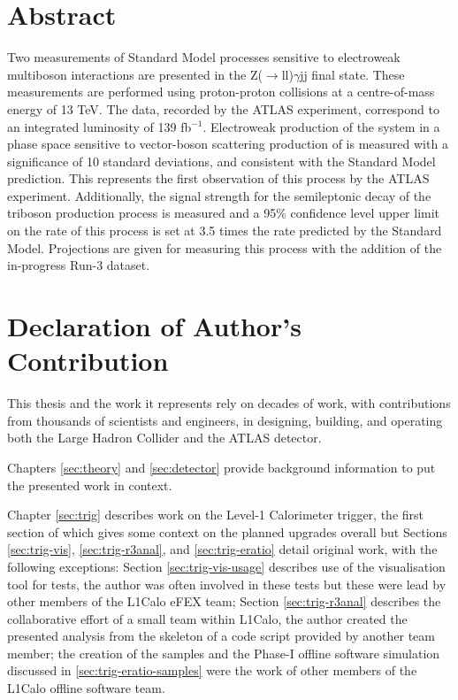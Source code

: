 \chapter*{Abstract}
Two measurements of Standard Model processes sensitive to electroweak multiboson
interactions are presented in the Z($\to$ll)$\gamma$jj final state. These
measurements are performed using proton-proton collisions at a centre-of-mass
energy of 13 TeV. The data, recorded by the \acs{ATLAS} experiment, correspond
to an integrated luminosity of 139 fb$^{-1}$.  Electroweak production of the
\Zyjj system in a phase space sensitive to vector-boson scattering production of
\Zy is measured with a significance of 10 standard deviations, and consistent
with the Standard Model prediction. This represents the first observation of
this process by the \acs{ATLAS} experiment.  Additionally, the signal strength
for the semileptonic decay of the \VZy triboson production process is measured
and a 95\% confidence level upper limit on the rate of this process is set at
3.5 times the rate predicted by the Standard Model. Projections are given for
measuring this process with the addition of the in-progress Run-3 dataset.
%
%
\clearpage
\chapter*{Declaration of Author's Contribution}

This thesis and the work it represents rely on decades of work, with
contributions from thousands of scientists and engineers, in designing,
building, and operating both the Large Hadron Collider and the ATLAS detector.

Chapters \ref{sec:theory} and \ref{sec:detector} provide background information
to put the presented work in context.

Chapter \ref{sec:trig} describes work on the Level-1 Calorimeter trigger, the
first section of which gives some context on the planned upgrades overall but
Sections \ref{sec:trig-vis}, \ref{sec:trig-r3anal}, and \ref{sec:trig-eratio}
detail original work, with the following exceptions: Section
\ref{sec:trig-vis-usage} describes use of the visualisation tool for tests, the
author was often involved in these tests but these were lead by other members of
the \acs{L1Calo} \acs{eFEX} team; Section \ref{sec:trig-r3anal} describes the
collaborative effort of a small team within \acs{L1Calo}, the author created the
presented analysis from the skeleton of a code script provided by another team
member; the creation of the samples and the Phase-I offline software simulation
discussed in \ref{sec:trig-eratio-samples} were the work of other members of the
\acs{L1Calo} offline software team.

